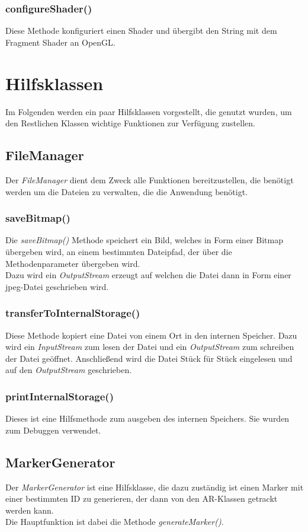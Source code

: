 \subsubsection{configureShader()}
Diese Methode konfiguriert einen Shader und übergibt den String mit dem Fragment Shader an OpenGL.



\section{Hilfsklassen}
Im Folgenden werden ein paar Hilfsklassen vorgestellt, die genutzt wurden, um den Restlichen Klassen wichtige Funktionen zur Verfügung zustellen.

\subsection{FileManager}
Der \textit{FileManager} dient dem Zweck alle Funktionen bereitzustellen, die benötigt werden um die Dateien zu verwalten, die die Anwendung benötigt.

\subsubsection{saveBitmap()}
Die \textit{saveBitmap()} Methode speichert ein Bild, welches in Form einer Bitmap übergeben wird, an einem bestimmten Dateipfad, der über die Methodenparameter übergeben wird. \\
Dazu wird ein \textit{OutputStream} erzeugt auf welchen die Datei dann in Form einer jpeg-Datei geschrieben wird.

\subsubsection{transferToInternalStorage()}
Diese Methode kopiert eine Datei von einem Ort in den internen Speicher. Dazu wird ein \textit{InputStream} zum lesen der Datei und ein \textit{OutputStream} zum schreiben der Datei geöffnet. Anschließend wird die Datei Stück für Stück eingelesen und auf den \textit{OutputStream} geschrieben.

\subsubsection{printInternalStorage()}
Dieses ist eine Hilfsmethode zum ausgeben des internen Speichers. Sie wurden zum Debuggen verwendet.


\subsection{MarkerGenerator}
Der \textit{MarkerGenerator} ist eine Hilfsklasse, die dazu zuständig ist einen Marker mit einer bestimmten ID zu generieren, der dann von den AR-Klassen getrackt werden kann.\\ Die Hauptfunktion ist dabei die Methode \textit{generateMarker()}.

